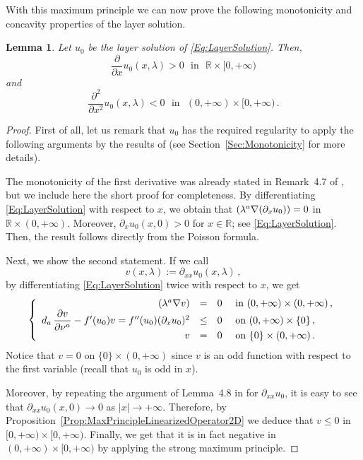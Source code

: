 \documentclass[12pt,reqno]{amsart}
\newtheorem{lemma}[theorem]{Lemma}
\theoremstyle{definition}
\theoremstyle{remark}
\newcommand{\con}[1]{\mathbb{#1}}
\newcommand{\R}{\con{R}} %
\newcommand\beqc[1]{\left\{\begin{array}{#1}}
\newcommand\eeqc{\end{array} \right.}
\def\PDEsystem{rcll}
\let\div\relax
\DeclareMathOperator{\div}{div}
\numberwithin{equation}{section}
\begin{document}
With this maximum principle we can now prove the following monotonicity and concavity properties of the layer solution.

\begin{lemma}
\label{Lemma:MonotonicityLayer}
Let $u_0$ be the layer solution of \eqref{Eq:LayerSolution}. Then,
$$ \frac{\partial}{\partial x} u_0(x,\lambda) > 0 \ \ \ \text{in} \ \ \ \R\times [0,+\infty) $$
and
$$ \frac{\partial^2}{\partial x^2} u_0(x,\lambda) < 0 \ \ \ \text{in} \ \ \ (0,+\infty)\times [0,+\infty)\,. $$
\end{lemma}

\begin{proof}
First of all, let us remark that $u_0$ has the required regularity to apply the following arguments by the results of \cite{CabreSireI} (see Section~\ref{Sec:Monotonicity} for more details).


The monotonicity of the first derivative was already stated in Remark~4.7 of \cite{CabreSireI}, but we include here the short proof for completeness. By differentiating \eqref{Eq:LayerSolution} with respect to $x$, we obtain that $\div(\lambda^a \nabla (\partial_x u_0)) = 0$ in $\R\times (0,+\infty)$. Moreover,  $\partial_x u_0(x,0) > 0$ for $x\in \R$; see \eqref{Eq:LayerSolution}. Then, the result follows directly from the Poisson formula.

Next, we show the second statement. If we call 
$$
v(x,\lambda) := \partial_{xx} u_0(x,\lambda)\,,
$$
by differentiating \eqref{Eq:LayerSolution} twice with respect to $x$, we get
\begin{equation*}
\beqc{\PDEsystem}
\div(\lambda^a \nabla v) &=& 0 & \text{ in } (0,+\infty)\times (0,+\infty) \,, \\
d_a\,\dfrac{\partial v}{\partial \nu^a} - f'(u_0) v = f''(u_0) (\partial_x u_0) ^2 &\leq & 0 & \text{ on } (0,+\infty) \times \{0\} \,, \\
v & = & 0 & \text{ on } \{0\} \times (0,+\infty)\,.
\eeqc
\end{equation*}
Notice that $v = 0$ on $\{0\} \times (0,+\infty)$ since $v$ is an odd function with respect to the first variable (recall that $u_0$ is odd in $x$).

Moreover, by repeating the argument of Lemma~4.8 in \cite{CabreSireI} for $\partial_{xx} u_0$, it is easy to see that $\partial_{xx} u_0(x,0) \to 0$ as $|x|\to +\infty$. Therefore, by Proposition~\ref{Prop:MaxPrincipleLinearizedOperator2D} we deduce that $v\leq 0$ in $[0,+\infty)\times [0,+\infty)$. Finally, we get that it is in fact negative in $(0,+\infty)\times [0,+\infty)$ by applying the strong maximum principle.
\end{proof}
\end{document}
